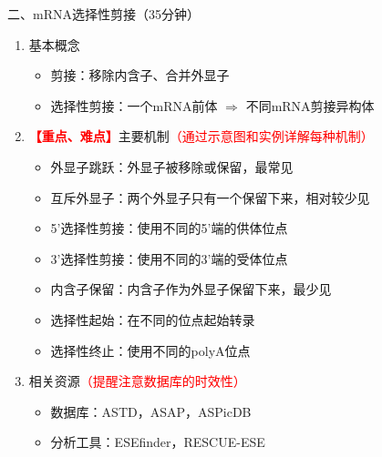 \documentclass{TIJMUjiaoanLL}
\begin{document}
\vspace*{0.2cm}
\noindent
二、mRNA选择性剪接（35分钟）
\begin{enumerate}
  \item 基本概念
    \begin{itemize}
      \item 剪接：移除内含子、合并外显子
      \item 选择性剪接：一个mRNA前体 $\Rightarrow$ 不同mRNA剪接异构体
    \end{itemize}
  \item \textcolor{red}{\textbf{【重点、难点】}}主要机制\textcolor{red}{（通过示意图和实例详解每种机制）}
    \begin{itemize}
      \item 外显子跳跃：外显子被移除或保留，最常见
      \item 互斥外显子：两个外显子只有一个保留下来，相对较少见
      \item 5'选择性剪接：使用不同的5'端的供体位点
      \item 3'选择性剪接：使用不同的3'端的受体位点
      \item 内含子保留：内含子作为外显子保留下来，最少见
      \item 选择性起始：在不同的位点起始转录
      \item 选择性终止：使用不同的polyA位点
    \end{itemize}
  \item 相关资源\textcolor{red}{（提醒注意数据库的时效性）}
    \begin{itemize}
      \item 数据库：ASTD，ASAP，ASPicDB
      \item 分析工具：ESEfinder，RESCUE-ESE
    \end{itemize}
\end{enumerate}


\otherTail
\newpage
\otherHeader
\end{document}
